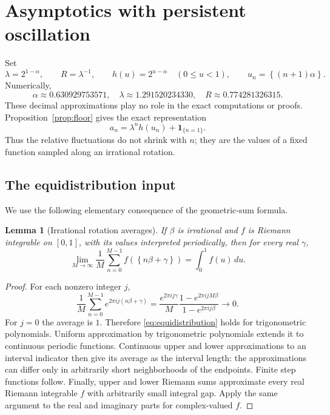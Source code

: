 \documentclass[11pt,letterpaper]{article}
\numberwithin{equation}{section}
\newtheorem{lemma}[theorem]{Lemma}
\theoremstyle{definition}
\theoremstyle{remark}
\newcommand{\ind}[1]{\boldsymbol{1}_{\{#1\}}}
\newcommand{\fracpart}[1]{\left\{#1\right\}}
\begin{document}
\section{Asymptotics with persistent oscillation}\label{sec:asymptotics}

Set
\begin{equation}\label{eq:constants}
 \lambda=2^{1-\alpha},\qquad R=\lambda^{-1},\qquad
 h(u)=2^{u-\alpha}\quad(0\le u<1),\qquad
 u_n=\fracpart{(n+1)\alpha}.
\end{equation}
Numerically,
\[
 \alpha\approx0.630929753571,\quad
 \lambda\approx1.291520234330,\quad
 R\approx0.774281326315.
\]
These decimal approximations play no role in the exact computations or
proofs. Proposition~\ref{prop:floor} gives the exact representation
\begin{equation}\label{eq:profile}
 a_n=\lambda^n h(u_n)+\ind{n=1}.
\end{equation}
Thus the relative fluctuations do not shrink with $n$; they are the values
of a fixed function sampled along an irrational rotation.

\subsection{The equidistribution input}
We use the following elementary consequence of the geometric-sum formula.

\begin{lemma}[Irrational rotation averages]\label{lem:rotation}
If $\beta$ is irrational and $f$ is Riemann integrable on $[0,1]$, with
its values interpreted periodically, then for every real $\gamma$,
\begin{equation}\label{eq:equidistribution}
 \lim_{M\to\infty}\frac1M\sum_{n=0}^{M-1}
 f(\fracpart{n\beta+\gamma})=\int_0^1f(u)\,du.
\end{equation}
\end{lemma}
\begin{proof}
For each nonzero integer $j$,
\[
 \frac1M\sum_{n=0}^{M-1}e^{2\pi i j(n\beta+\gamma)}
 =\frac{e^{2\pi i j\gamma}}{M}
   \frac{1-e^{2\pi i jM\beta}}{1-e^{2\pi i j\beta}}
 \longrightarrow0.
\]
For $j=0$ the average is $1$. Therefore \eqref{eq:equidistribution} holds
for trigonometric polynomials. Uniform approximation by trigonometric
polynomials extends it to continuous periodic functions.
Continuous upper and lower approximations to an interval indicator then
give its average as the interval length: the approximations can differ only
in arbitrarily short neighborhoods of the endpoints. Finite step functions
follow. Finally, upper and lower Riemann sums approximate every real Riemann
integrable $f$ with arbitrarily small integral gap. Apply the same argument
to the real and imaginary parts for complex-valued $f$.
\end{proof}
\end{document}

